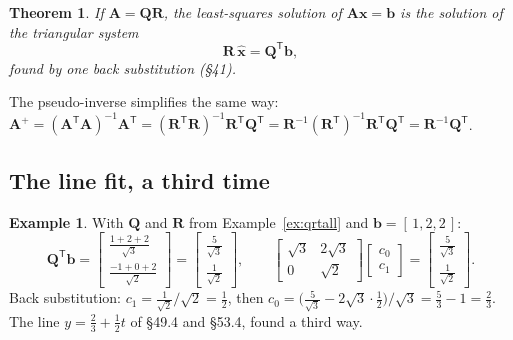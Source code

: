 \documentclass[11pt]{article}
\theoremstyle{plain}
\newtheorem{thm}{Theorem}[section]
\theoremstyle{definition}
\newtheorem{ex}{Example}[section]
\theoremstyle{remark}
\newcommand{\vc}[1]{\mathbf{#1}}
\newcommand{\mt}[1]{\mathbf{#1}}
\newcommand{\T}{^{\mathsf{T}}}
\newcommand{\xh}{\hat{\vc{x}}}
\begin{document}
\begin{thm}
\label{thm:qrls}
If $\mt{A}=\mt{Q}\mt{R}$, the least-squares solution of $\mt{A}\vc{x}=\vc{b}$ is the
solution of the triangular system
\[
  \boxed{\;\mt{R}\,\xh=\mt{Q}\T\vc{b},\;}
\]
found by one back substitution (\S41).
\end{thm}

\noindent The pseudo-inverse simplifies the same way:
$\mt{A}^{+}=(\mt{A}\T\mt{A})^{-1}\mt{A}\T=(\mt{R}\T\mt{R})^{-1}\mt{R}\T\mt{Q}\T
=\mt{R}^{-1}(\mt{R}\T)^{-1}\mt{R}\T\mt{Q}\T=\mt{R}^{-1}\mt{Q}\T$.

\subsection{The line fit, a third time}
\begin{ex}
With $\mt{Q}$ and $\mt{R}$ from Example~\ref{ex:qrtall} and $\vc{b}=[\,1,2,2\,]$:
\[
  \mt{Q}\T\vc{b}=\begin{bmatrix}\frac{1+2+2}{\sqrt3}\\[3pt]\frac{-1+0+2}{\sqrt2}\end{bmatrix}
  =\begin{bmatrix}\frac{5}{\sqrt3}\\[3pt]\frac{1}{\sqrt2}\end{bmatrix},
  \qquad
  \begin{bmatrix}\sqrt3&2\sqrt3\\0&\sqrt2\end{bmatrix}
  \begin{bmatrix}c_0\\c_1\end{bmatrix}
  =\begin{bmatrix}\frac{5}{\sqrt3}\\[3pt]\frac{1}{\sqrt2}\end{bmatrix}.
\]
Back substitution: $c_1=\frac{1}{\sqrt2}\big/\sqrt2=\frac12$, then
$c_0=\bigl(\frac{5}{\sqrt3}-2\sqrt3\cdot\frac12\bigr)\big/\sqrt3=\frac53-1=\frac23$.
The line $y=\frac23+\frac12t$ of \S49.4 and \S53.4, found a third way.
\end{ex}

\end{document}
